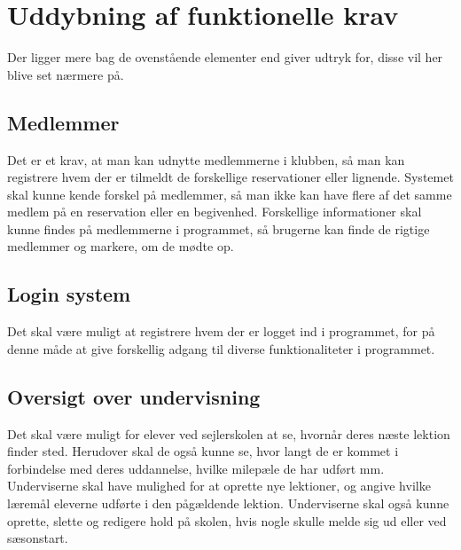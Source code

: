 
\section{Uddybning af funktionelle krav}

Der ligger mere bag de ovenstående elementer end  giver udtryk for, disse vil her blive set nærmere på.

\subsection{Medlemmer} 

Det er et krav, at man kan udnytte medlemmerne i klubben, så man kan registrere hvem der er tilmeldt de forskellige reservationer eller lignende.
Systemet skal kunne kende forskel på medlemmer, så man ikke kan have flere af det samme medlem på en reservation eller en begivenhed.
Forskellige informationer skal kunne findes på medlemmerne i programmet, så brugerne kan finde de rigtige medlemmer og markere, om de mødte op.

\subsection{Login system} 
Det skal være muligt at registrere hvem der er logget ind i programmet, for på denne måde at give forskellig adgang til diverse funktionaliteter i programmet.

\subsection{Oversigt over undervisning}

Det skal være muligt for elever ved sejlerskolen at se, hvornår deres næste lektion finder sted.
Herudover skal de også kunne se, hvor langt de er kommet i forbindelse med deres uddannelse, hvilke milepæle de har udført mm.
Underviserne skal have mulighed for at oprette nye lektioner, og angive hvilke læremål eleverne udførte i den pågældende lektion. 
Underviserne skal også kunne oprette, slette og redigere hold på skolen, hvis nogle skulle melde sig ud eller ved sæsonstart. 

